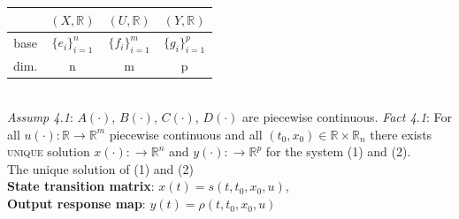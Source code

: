 \documentclass[10pt,landscape]{article}
\begin{document}
\begin{multicols*}{4}
\begin{tabular}{|c|c|c|c|}
\hline
 & $(X, \mathbb{R})$ & $(U, \mathbb{R})$ & $(Y, \mathbb{R})$\\
\hline
base & $ \{ e_i \}_{i=1}^n $ & $\{f_i\}_{i=1}^m $ & $\{g_i\}_{i=1}^p $\\
\hline
dim. & n & m & p\\
\hline
\end{tabular}\\
\textit{Assump 4.1}: $A(\cdot)$, $B(\cdot)$, $C(\cdot)$, $D(\cdot)$ are piecewise continuous.
\textit{Fact 4.1}: For all $u(\cdot): \mathbb{R} \rightarrow \mathbb{R}^m$ piecewise continuous and all $(t_0, x_0) \in \mathbb{R} \times \mathbb{R}_n$ there exists \textsc{unique} solution $x(\cdot):  \rightarrow \mathbb{R}^n$ and $y(\cdot):  \rightarrow \mathbb{R}^p$ for the system (1) and (2).\\
The unique solution of (1) and (2)\\
\textbf{State transition matrix}: $x(t) = s(t, t_0, x_0, u)$,\\
\textbf{Output response map}: $y(t) = \rho(t, t_0, x_0, u)$
\end{multicols*}
\end{document}
